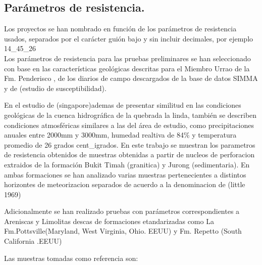 \subsection{Par\'ametros de resistencia.}
Los proyectos se han nombrado en funci\'{o}n de los par\'{a}metros de resistencia usados,
separados por el car\'{a}cter gui\'{o}n bajo y sin incluir decimales, por ejemplo 14\_45\_26\\

Los par\'ametros de resistencia para las pruebas preliminares se han seleccionado con base en las caracter\'isticas geol\'ogicas descritas para el Miembro Urrao de la Fm. Penderisco , de los diarios de campo descargados de la base de datos SIMMA \cite{libreta} y de (estudio de susceptibilidad).

En el estudio de (singapore)ademas de presentar similitud en las condiciones geol\'ogicas de la cuenca hidrogr\'afica de la quebrada la linda, tambi\'en se describen condiciones atmosf\'ericas similares a las del \'area de estudio, como precipitaciones anuales entre 2000mm y 3000mm, humedad realtiva de 84\% y temperatura promedio de 26 grados cent\_igrados.
\linebreak 
En este trabajo se muestran los parametros de resistencia obtenidos de muestras obtenidas a partir de nucleos de perforacion extraidos de la formaci\'on Bukit Timah (granitica) y Jurong (sedimentaria). En ambas formaciones se han analizado varias muestras pertenecientes a distintos horizontes de meteorizacion separados de acuerdo a la denominacion de (little 1969)

Adicionalmente se han realizado pruebas con par\'ametros correspondientes a Areniscas y Limolitas descas de formaciones etandarizadas como La Fm.Pottsville(Maryland, West Virginia, Ohio. EEUU) y Fm. Repetto (South California .EEUU) 

Las muestras tomadas como referencia son: 



